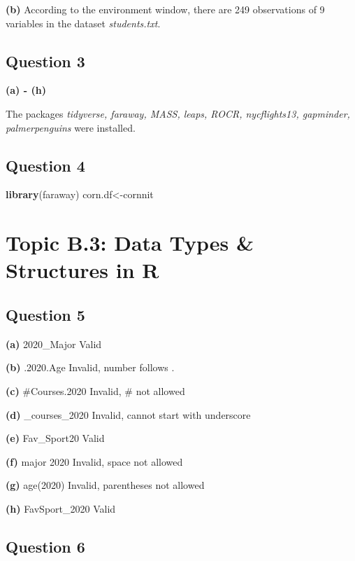 \documentclass[
  openany]{book}
\newenvironment{Shaded}{\begin{snugshade}}{\end{snugshade}}
\newcommand{\FunctionTok}[1]{\textcolor[rgb]{0.13,0.29,0.53}{\textbf{#1}}}
\newcommand{\NormalTok}[1]{#1}
\newcommand{\OtherTok}[1]{\textcolor[rgb]{0.56,0.35,0.01}{#1}}
\begin{document}
\textbf{(b)}
According to the environment window, there are 249 observations of 9 variables in the dataset \emph{students.txt}.

\subsection{Question 3}\label{question-3}

\textbf{(a) - (h)}

The packages \emph{tidyverse, faraway, MASS, leaps, ROCR, nycflights13, gapminder, palmerpenguins} were installed.

\subsection{Question 4}\label{question-4}

\begin{Shaded}
\begin{Highlighting}[]
\FunctionTok{library}\NormalTok{(faraway)}
\NormalTok{corn.df}\OtherTok{\textless{}{-}}\NormalTok{cornnit}
\end{Highlighting}
\end{Shaded}

\section{Topic B.3: Data Types \& Structures in R}\label{topic-b.3-data-types-structures-in-r}

\subsection{Question 5}\label{question-5}

\textbf{(a)} 2020\_Major Valid

\textbf{(b)} .2020.Age Invalid, number follows .

\textbf{(c)} \#Courses.2020 Invalid, \# not allowed

\textbf{(d)} \_courses\_2020 Invalid, cannot start with underscore

\textbf{(e)} Fav\_Sport20 Valid

\textbf{(f)} major 2020 Invalid, space not allowed

\textbf{(g)} age(2020) Invalid, parentheses not allowed

\textbf{(h)} FavSport\_2020 Valid

\subsection{Question 6}\label{question-6}
\end{document}
